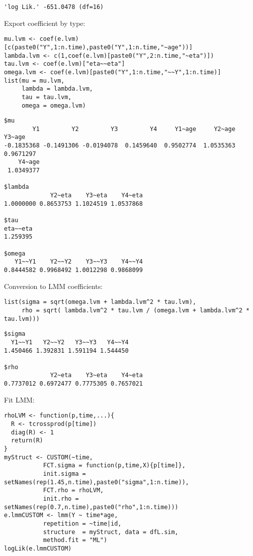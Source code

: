 \documentclass[12pt]{article}
\begin{document}
\begin{verbatim}
'log Lik.' -651.0478 (df=16)
\end{verbatim}


Export coefficient by type:
\lstset{language=r,label= ,caption= ,captionpos=b,numbers=none}
\begin{lstlisting}
mu.lvm <- coef(e.lvm)[c(paste0("Y",1:n.time),paste0("Y",1:n.time,"~age"))]
lambda.lvm <- c(1,coef(e.lvm)[paste0("Y",2:n.time,"~eta")])
tau.lvm <- coef(e.lvm)["eta~~eta"]
omega.lvm <- coef(e.lvm)[paste0("Y",1:n.time,"~~Y",1:n.time)]
list(mu = mu.lvm,
     lambda = lambda.lvm,
     tau = tau.lvm,
     omega = omega.lvm)
\end{lstlisting}

\begin{verbatim}
$mu
        Y1         Y2         Y3         Y4     Y1~age     Y2~age     Y3~age 
-0.1835368 -0.1491306 -0.0194078  0.1459640  0.9502774  1.0535363  0.9671297 
    Y4~age 
 1.0349377 

$lambda
             Y2~eta    Y3~eta    Y4~eta 
1.0000000 0.8653753 1.1024519 1.0537868 

$tau
eta~~eta 
1.259395 

$omega
   Y1~~Y1    Y2~~Y2    Y3~~Y3    Y4~~Y4 
0.8444582 0.9968492 1.0012298 0.9868099
\end{verbatim}

Conversion to LMM coefficients:
\lstset{language=r,label= ,caption= ,captionpos=b,numbers=none}
\begin{lstlisting}
list(sigma = sqrt(omega.lvm + lambda.lvm^2 * tau.lvm),
     rho = sqrt( lambda.lvm^2 * tau.lvm / (omega.lvm + lambda.lvm^2 * tau.lvm)))
\end{lstlisting}

\begin{verbatim}
$sigma
  Y1~~Y1   Y2~~Y2   Y3~~Y3   Y4~~Y4 
1.450466 1.392831 1.591194 1.544450 

$rho
             Y2~eta    Y3~eta    Y4~eta 
0.7737012 0.6972477 0.7775305 0.7657021
\end{verbatim}


\clearpage

Fit LMM:
\lstset{language=r,label= ,caption= ,captionpos=b,numbers=none}
\begin{lstlisting}
rhoLVM <- function(p,time,...){
  R <- tcrossprod(p[time])
  diag(R) <- 1
  return(R)
}
myStruct <- CUSTOM(~time,
		   FCT.sigma = function(p,time,X){p[time]},
		   init.sigma = setNames(rep(1.45,n.time),paste0("sigma",1:n.time)),
		   FCT.rho = rhoLVM,
		   init.rho = setNames(rep(0.7,n.time),paste0("rho",1:n.time)))
e.lmmCUSTOM <- lmm(Y ~ time*age,
		   repetition = ~time|id,
		   structure  = myStruct, data = dfL.sim,
		   method.fit = "ML")
logLik(e.lmmCUSTOM)
\end{lstlisting}
\end{document}
